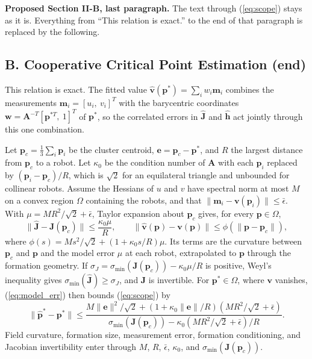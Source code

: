 \documentclass[10pt]{article}
\begin{document}
\setcounter{equation}{7}

\noindent\textbf{Proposed Section II-B, last paragraph.} The text through (\ref{eq:scope}) stays as it is. Everything from ``This relation is exact.'' to the end of that paragraph is replaced by the following.

\subsection*{B. Cooperative Critical Point Estimation (end)}

This relation is exact. The fitted value $\hat{\mathbf{v}}(\mathbf{p}^*) = \sum_i w_i\mathbf{m}_i$ combines the measurements $\mathbf{m}_i = [u_i,\ v_i]^T$ with the barycentric coordinates $\mathbf{w} = \mathbf{A}^{-T}[\mathbf{p}^{*T},\ 1]^T$ of $\mathbf{p}^*$, so the correlated errors in $\hat{\mathbf{J}}$ and $\hat{\mathbf{h}}$ act jointly through this one combination.

Let $\mathbf{p}_c = \frac{1}{3}\sum_i\mathbf{p}_i$ be the cluster centroid, $\mathbf{e} = \mathbf{p}_c - \mathbf{p}^*$, and $R$ the largest distance from $\mathbf{p}_c$ to a robot. Let $\kappa_0$ be the condition number of $\mathbf{A}$ with each $\mathbf{p}_i$ replaced by $(\mathbf{p}_i - \mathbf{p}_c)/R$, which is $\sqrt{2}$ for an equilateral triangle and unbounded for collinear robots. Assume the Hessians of $u$ and $v$ have spectral norm at most $M$ on a convex region $\Omega$ containing the robots, and that $\|\mathbf{m}_i - \mathbf{v}(\mathbf{p}_i)\| \le \bar{\epsilon}$. With $\mu = MR^2/\sqrt{2} + \bar{\epsilon}$, Taylor expansion about $\mathbf{p}_c$ gives, for every $\mathbf{p} \in \Omega$,
\begin{equation}\label{eq:model_err}
\|\hat{\mathbf{J}} - \mathbf{J}(\mathbf{p}_c)\| \le \frac{\kappa_0\mu}{R}, \qquad \|\hat{\mathbf{v}}(\mathbf{p}) - \mathbf{v}(\mathbf{p})\| \le \phi(\|\mathbf{p} - \mathbf{p}_c\|),
\end{equation}
where $\phi(s) = Ms^2/\sqrt{2} + (1 + \kappa_0 s/R)\mu$. Its terms are the curvature between $\mathbf{p}_c$ and $\mathbf{p}$ and the model error $\mu$ at each robot, extrapolated to $\mathbf{p}$ through the formation geometry. If $\sigma_J = \sigma_{\min}(\mathbf{J}(\mathbf{p}_c)) - \kappa_0\mu/R$ is positive, Weyl's inequality gives $\sigma_{\min}(\hat{\mathbf{J}}) \ge \sigma_J$, and $\hat{\mathbf{J}}$ is invertible. For $\mathbf{p}^* \in \Omega$, where $\mathbf{v}$ vanishes, (\ref{eq:model_err}) then bounds (\ref{eq:scope}) by
\begin{equation}\label{eq:err_bound}
\|\hat{\mathbf{p}}^* - \mathbf{p}^*\| \le \frac{M\|\mathbf{e}\|^2/\sqrt{2} + (1 + \kappa_0\|\mathbf{e}\|/R)(MR^2/\sqrt{2} + \bar{\epsilon})}{\sigma_{\min}(\mathbf{J}(\mathbf{p}_c)) - \kappa_0(MR^2/\sqrt{2} + \bar{\epsilon})/R}.
\end{equation}
Field curvature, formation size, measurement error, formation conditioning, and Jacobian invertibility enter through $M$, $R$, $\bar{\epsilon}$, $\kappa_0$, and $\sigma_{\min}(\mathbf{J}(\mathbf{p}_c))$.
\end{document}
